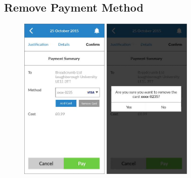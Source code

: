 \subsection{Remove Payment Method}

\begin{figure}
  \subfigures
  \centering
  \begin{minipage}{4.6cm}
    \centering
    \includegraphics[width=4.2cm]{inc/ui_payment_rm_step1.jpg}
    \caption{}
    \label{fig:ui_payment_rm_step1}
  \end{minipage}
  \begin{minipage}{4.6cm}
    \centering
    \includegraphics[width=4.2cm]{inc/ui_payment_rm_step2.jpg}
    \caption{}
    \label{fig:ui_payment_rm_step2}
  \end{minipage}
\end{figure}

